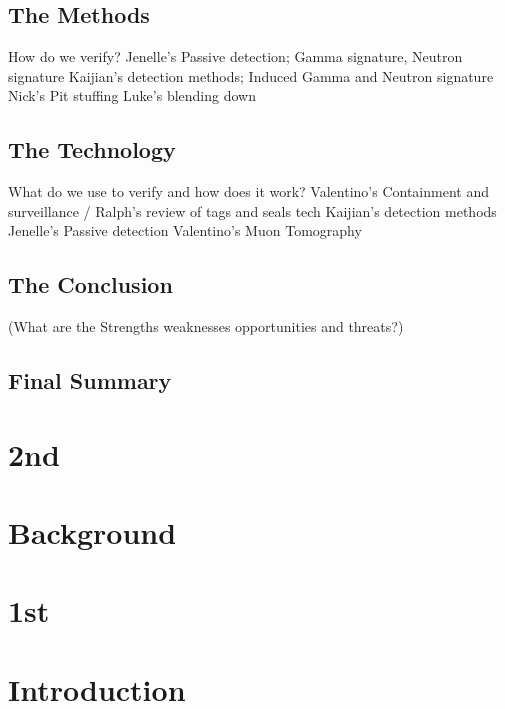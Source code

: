\documentclass[twoside,titlepage,11pt,twocolumn,a4paper]{article}
\begin{document}
\subsection*{The Methods}
How do we verify?
Jenelle's Passive detection; Gamma signature, Neutron signature
Kaijian's detection methods; Induced Gamma and Neutron signature 
Nick's Pit stuffing
Luke's blending down
\subsection*{The Technology}
What do we use to verify and how does it work?
Valentino's Containment and surveillance / Ralph's review of tags and seals tech
Kaijian's detection methods
Jenelle's Passive detection
Valentino's Muon Tomography 

\subsection*{The Conclusion}
(What are the Strengths weaknesses opportunities and threats?)
\subsection*{Final Summary}

\newpage
\tableofcontents
\twocolumn

\section{2nd}

\section{Background}


\section{1st}
\section{Introduction}
\end{document}
